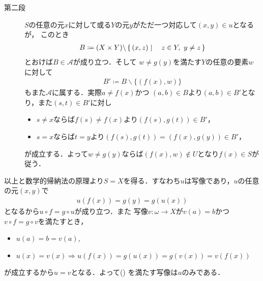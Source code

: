 \begin{prf}
\begin{description}
			\item[第二段] 
				$S$の任意の元$x$に対して或る$Y$の元$y$がただ一つ対応して$(x,y) \in u$となるが，
				このとき
				\begin{align}
					B \coloneqq (X \times Y) \backslash \left\{\, (x,z) \mid \quad z \in Y,\ y \neq z\, \right\}
				\end{align}
				とおけば$B \in \mathscr{A}$が成り立つ．そして
				$w \neq g(y)$を満たす$Y$の任意の要素$w$に対して
				\begin{align}
					B' \coloneqq B \backslash \{(f(x),w)\}
				\end{align}
				もまた$\mathscr{A}$に属する．実際$a \neq f(x)$かつ
				$(a,b) \in B$より$(a,b) \in B'$となり，また$(s,t) \in B'$に対し
				\begin{itemize}
					\item $s \neq x$ならば$f(s) \neq f(x)$より$(f(s),g(t)) \in B'$，
					\item $s=x$ならば$t = y$より$(f(s),g(t)) = (f(x),g(y)) \in B'$，
				\end{itemize}
				が成立する．よって$w \neq g(y)$ならば$(f(x),w) \notin U$となり$f(x) \in S$が従う．
		\end{description}
		以上と数学的帰納法の原理より$S = X$を得る．すなわち$u$は写像であり，$u$の任意の元$(x,y)$で
		\begin{align}
			u(f(x)) = g(y) = g(u(x))
		\end{align}
		となるから$u \circ f = g \circ u$が成り立つ．また
		写像$v:\omega \longrightarrow X$が$v(a) = b$かつ
		$v \circ f = g \circ v$を満たすとき，
		\begin{itemize}
			\item $u(a) = b = v(a)$,
			\item $u(x) = v(x) \Longrightarrow 
				u(f(x)) = g(u(x)) = g(v(x)) = v(f(x))$
		\end{itemize}
		が成立するから$u = v$となる．よって()
		を満たす写像は$u$のみである．
		\QED
	\end{prf}